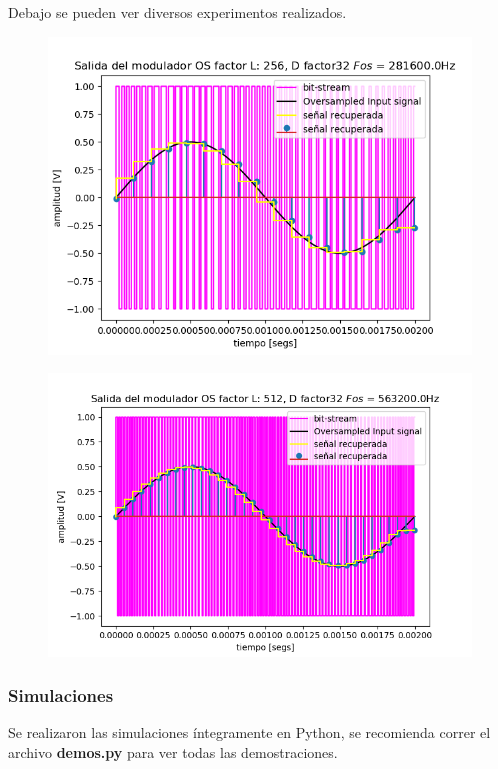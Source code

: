 Debajo se pueden ver diversos experimentos realizados.

\begin{figure}[H]
	\centering
	\includegraphics[width=0.7\linewidth]{ImagenesEjercicio2/SenalRecuperada256.png}
	\caption{}
	\label{fig:senalrecuperada256}
\end{figure}
\begin{figure}[H]
	\centering
	\includegraphics[width=0.7\linewidth]{ImagenesEjercicio2/SenalRecuperada512.png}
	\caption{}
	\label{fig:senalrecuperada256}
\end{figure}

\subsubsection{Simulaciones}
Se realizaron las simulaciones íntegramente en Python, se recomienda correr el archivo \textbf{demos.py} para ver todas las demostraciones.

%